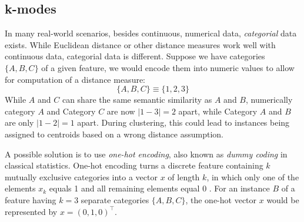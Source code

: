 \subsection{k-modes} \label{k-modes}

In many real-world scenarios, besides continuous, numerical data, \textit{categorial} data exists. While Euclidean distance or other distance measures work well with continuous data, categorial data is different. Suppose we have categories $\{A, B, C\}$ of a given feature, we would encode them into numeric values to allow for computation of a distance measure:
$$\{A, B, C\} \equiv \{1, 2, 3\}$$
While $A$ and $C$ can share the same semantic similarity as $A$ and $B$, numerically category $A$ and Category $C$ are now $|1-3| = 2$ apart, while Category $A$ and $B$ are only $|1-2|=1$ apart. During clustering, this could lead to instances being assigned to centroids based on a wrong distance assumption.

A possible solution is to use \textit{one-hot encoding}, also known as \textit{dummy coding} in classical statistics. One-hot encoding turns a discrete feature containing $k$ mutually exclusive categories into a vector $x$ of length $k$, in which only one of the elements $x_k$ equals 1 and all remaining elements equal 0 \cite{pattern_recognition_machine_learning}. For an instance $B$ of a feature having $k=3$ separate categories $\{A, B, C\}$, the one-hot vector $x$ would be represented by $x = (0, 1, 0)^{\intercal}$.

